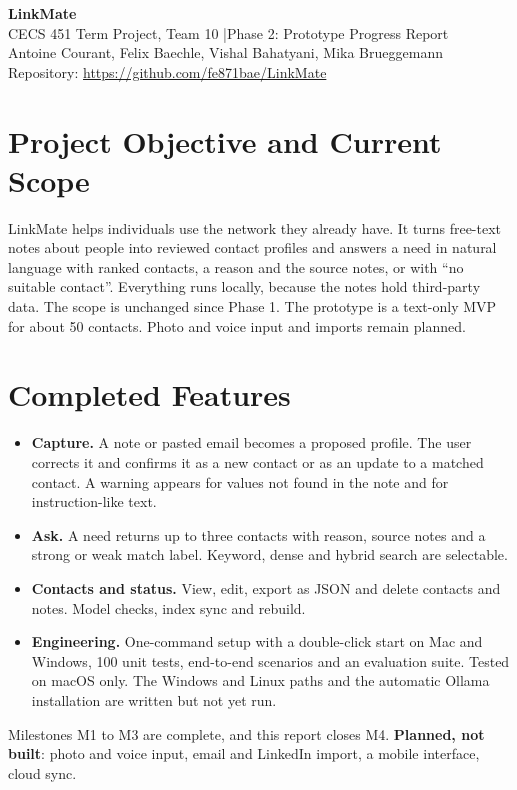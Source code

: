 \documentclass[10pt,letterpaper]{article}
\newcommand{\repourl}{\url{https://github.com/fe871bae/LinkMate}}
\begin{document}
\begin{center}
  {\Large\bfseries LinkMate}\\[1pt]
  CECS 451 Term Project, Team 10 \quad|\quad Phase 2: Prototype Progress Report\\[1pt]
  Antoine Courant, Felix Baechle, Vishal Bahatyani, Mika Brueggemann\\[1pt]
  Repository: \repourl
\end{center}

\section{Project Objective and Current Scope}
LinkMate helps individuals use the network they already have. It turns free-text notes about people into reviewed contact profiles and answers a need in natural language with ranked contacts, a reason and the source notes, or with ``no suitable contact''. Everything runs locally, because the notes hold third-party data. The scope is unchanged since Phase 1. The prototype is a text-only MVP for about 50 contacts. Photo and voice input and imports remain planned.

\section{Completed Features}
\begin{itemize}
  \item \textbf{Capture.} A note or pasted email becomes a proposed profile. The user corrects it and confirms it as a new contact or as an update to a matched contact. A warning appears for values not found in the note and for instruction-like text.
  \item \textbf{Ask.} A need returns up to three contacts with reason, source notes and a strong or weak match label. Keyword, dense and hybrid search are selectable.
  \item \textbf{Contacts and status.} View, edit, export as JSON and delete contacts and notes. Model checks, index sync and rebuild.
  \item \textbf{Engineering.} One-command setup with a double-click start on Mac and Windows, 100 unit tests, end-to-end scenarios and an evaluation suite. Tested on macOS only. The Windows and Linux paths and the automatic Ollama installation are written but not yet run.
\end{itemize}
Milestones M1 to M3 are complete, and this report closes M4. \textbf{Planned, not built}: photo and voice input, email and LinkedIn import, a mobile interface, cloud sync.
\end{document}
